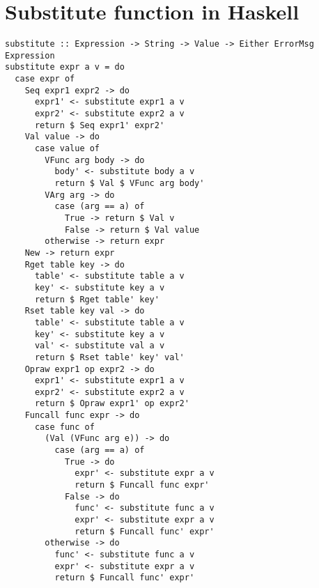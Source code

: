 \chapter{Substitute function in Haskell\label{app:substitute}}

\begin{verbatim}
substitute :: Expression -> String -> Value -> Either ErrorMsg Expression
substitute expr a v = do
  case expr of
    Seq expr1 expr2 -> do
      expr1' <- substitute expr1 a v
      expr2' <- substitute expr2 a v
      return $ Seq expr1' expr2'
    Val value -> do
      case value of
        VFunc arg body -> do
          body' <- substitute body a v
          return $ Val $ VFunc arg body'
        VArg arg -> do
          case (arg == a) of
            True -> return $ Val v
            False -> return $ Val value
        otherwise -> return expr
    New -> return expr
    Rget table key -> do
      table' <- substitute table a v
      key' <- substitute key a v
      return $ Rget table' key'
    Rset table key val -> do
      table' <- substitute table a v
      key' <- substitute key a v
      val' <- substitute val a v
      return $ Rset table' key' val'
    Opraw expr1 op expr2 -> do
      expr1' <- substitute expr1 a v
      expr2' <- substitute expr2 a v
      return $ Opraw expr1' op expr2'
    Funcall func expr -> do
      case func of
        (Val (VFunc arg e)) -> do
          case (arg == a) of
            True -> do
              expr' <- substitute expr a v
              return $ Funcall func expr'
            False -> do
              func' <- substitute func a v
              expr' <- substitute expr a v
              return $ Funcall func' expr'
        otherwise -> do
          func' <- substitute func a v
          expr' <- substitute expr a v
          return $ Funcall func' expr'

\end{verbatim}